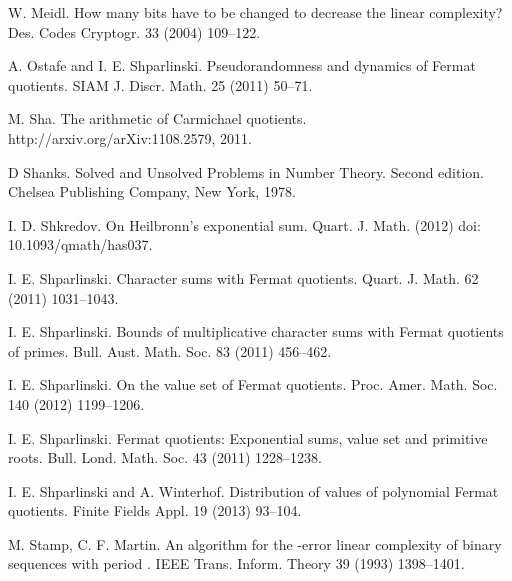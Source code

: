 \documentclass [11pt,a4paper]{article}
\begin{document}
\begin{thebibliography}{99}
 W. Meidl. How many bits have to be changed to decrease the linear
complexity? Des. Codes Cryptogr. 33 (2004) 109--122.







 A. Ostafe  and  I. E. Shparlinski. Pseudorandomness and dynamics of
Fermat quotients. SIAM J. Discr. Math. 25 (2011) 50--71.



M. Sha. The arithmetic of Carmichael quotients. http://arxiv.org/arXiv:1108.2579, 2011.

D Shanks. Solved and Unsolved Problems in Number Theory. Second edition. Chelsea
Publishing Company, New York, 1978.

I. D. Shkredov. On Heilbronn's exponential sum. Quart. J. Math. (2012) doi: 10.1093/qmath/has037.



I. E. Shparlinski. Character sums with Fermat quotients. Quart. J. Math. 62 (2011) 1031--1043.

 I. E. Shparlinski.  Bounds of multiplicative character sums with
Fermat quotients of primes. Bull. Aust. Math. Soc. 83 (2011)
456--462.

 I. E. Shparlinski.  On the value set of Fermat
quotients. Proc. Amer. Math. Soc. 140 (2012) 1199--1206.

 I. E. Shparlinski.  Fermat quotients: Exponential sums, value set and primitive
roots. Bull. Lond. Math. Soc.  43 (2011) 1228--1238.

I. E. Shparlinski  and A. Winterhof. Distribution of values of
polynomial Fermat quotients. Finite Fields Appl. 19 (2013)
93--104.




M. Stamp, C. F. Martin. An algorithm for the -error linear complexity of
 binary sequences with period . IEEE Trans. Inform. Theory 39 (1993)  1398--1401.


\end{thebibliography}
\end{document}
